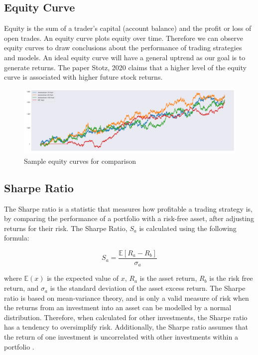 \subsection{Equity Curve}
Equity is the sum of a trader's capital (account balance) and the profit or loss of open trades. An equity curve plots equity over time. Therefore we can observe equity curves to draw conclusions about the performance of trading strategies and models. An ideal equity curve will have a general uptrend as our goal is to generate returns. The paper Stotz, 2020 \cite{stotz_equity_curve} claims that a higher level of the equity curve is associated with higher future stock returns.

\begin{figure}[h]
    \centering
    \includegraphics[scale=0.3]{background/equity_curves.png}
    \caption{Sample equity curves for comparison}
    \label{fig:my_label}
\end{figure}

\subsection{Sharpe Ratio}
The Sharpe ratio is a statistic that measures how profitable a trading strategy is, by comparing the performance of a portfolio with a risk-free asset, after adjusting returns for their risk. The Sharpe Ratio, $S_a$ is calculated using the following formula:

\begin{equation*}
S_a = \dfrac{\mathbb{E} \left[R_a - R_b \right]}{\sigma_a}
\end{equation*}

where $\mathbb{E}(x)$ is the expected value of $x$, $R_a$ is the asset return, $R_b$ is the risk free return, and $\sigma_a$ is the standard deviation of the asset excess return. The Sharpe ratio is based on mean-variance theory, and is only a valid measure of risk when the returns from an investment into an asset can be modelled by a normal distribution. Therefore, when calculated for other investments, the Sharpe ratio has a tendency to oversimplify risk. Additionally, the Sharpe ratio assumes that the return of one investment is uncorrelated with other investments within a portfolio \cite{sharpe_ratio}. 

